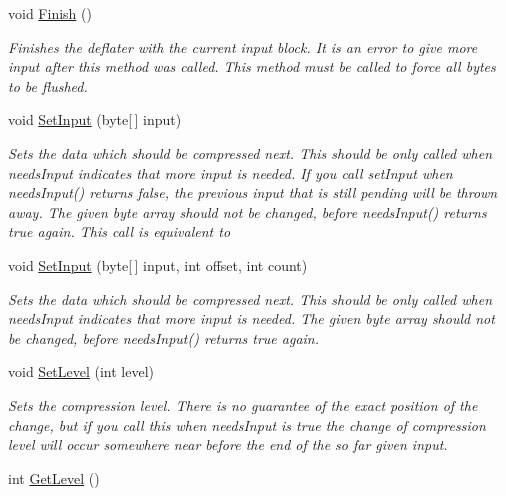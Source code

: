 \begin{DoxyCompactItemize}
void \hyperlink{class_i_c_sharp_code_1_1_sharp_zip_lib_1_1_zip_1_1_compression_1_1_deflater_a4a1b79d68b91057d4044d1d657b81f6c}{Finish} ()
\begin{DoxyCompactList}\small\item\em Finishes the deflater with the current input block. It is an error to give more input after this method was called. This method must be called to force all bytes to be flushed. \end{DoxyCompactList}\item 
void \hyperlink{class_i_c_sharp_code_1_1_sharp_zip_lib_1_1_zip_1_1_compression_1_1_deflater_a47dd1a3f861adb774c5a31414ad55667}{Set\+Input} (byte\mbox{[}$\,$\mbox{]} input)
\begin{DoxyCompactList}\small\item\em Sets the data which should be compressed next. This should be only called when needs\+Input indicates that more input is needed. If you call set\+Input when needs\+Input() returns false, the previous input that is still pending will be thrown away. The given byte array should not be changed, before needs\+Input() returns true again. This call is equivalent to \end{DoxyCompactList}\item 
void \hyperlink{class_i_c_sharp_code_1_1_sharp_zip_lib_1_1_zip_1_1_compression_1_1_deflater_a1b655a78dff6b6fa7374740f63342f25}{Set\+Input} (byte\mbox{[}$\,$\mbox{]} input, int offset, int count)
\begin{DoxyCompactList}\small\item\em Sets the data which should be compressed next. This should be only called when needs\+Input indicates that more input is needed. The given byte array should not be changed, before needs\+Input() returns true again. \end{DoxyCompactList}\item 
void \hyperlink{class_i_c_sharp_code_1_1_sharp_zip_lib_1_1_zip_1_1_compression_1_1_deflater_aeec1f91af74741790108b3af8f877b5e}{Set\+Level} (int level)
\begin{DoxyCompactList}\small\item\em Sets the compression level. There is no guarantee of the exact position of the change, but if you call this when needs\+Input is true the change of compression level will occur somewhere near before the end of the so far given input. \end{DoxyCompactList}\item 
int \hyperlink{class_i_c_sharp_code_1_1_sharp_zip_lib_1_1_zip_1_1_compression_1_1_deflater_af90d5712ba8aa8a034ee63125d747c71}{Get\+Level} ()

\end{DoxyCompactItemize}

